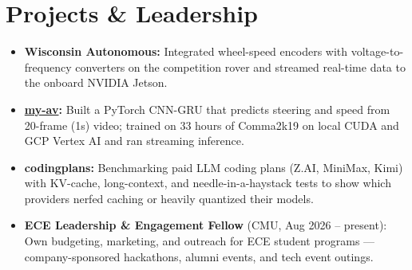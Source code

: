 \documentclass[11pt, letterpaper]{article}
\begin{document}
\section{Projects \& Leadership}
\begin{itemize}
  \item \textbf{Wisconsin Autonomous:} Integrated wheel-speed encoders with voltage-to-frequency converters on the competition rover and streamed real-time data to the onboard NVIDIA Jetson.
  \item \textbf{\href{https://github.com/lordphone/my-av}{my-av}:} Built a PyTorch CNN-GRU that predicts steering and speed from 20-frame (1s) video; trained on 33 hours of Comma2k19 on local CUDA and GCP Vertex AI and ran streaming inference.
  \item \textbf{codingplans:} Benchmarking paid LLM coding plans (Z.AI, MiniMax, Kimi) with KV-cache, long-context, and needle-in-a-haystack tests to show which providers nerfed caching or heavily quantized their models.
  \item \textbf{ECE Leadership \& Engagement Fellow} (CMU, Aug 2026 -- present): Own budgeting, marketing, and outreach for ECE student programs --- company-sponsored hackathons, alumni events, and tech event outings.
\end{itemize}
\end{document}
